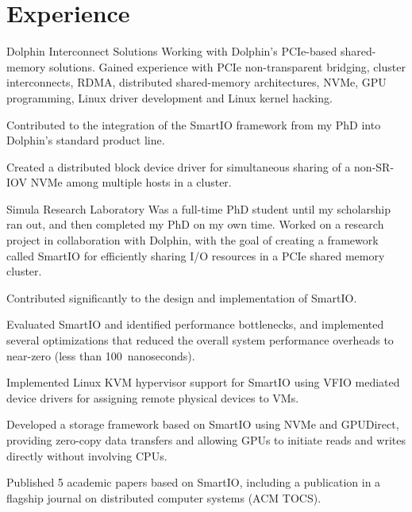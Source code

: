 \section{Experience}
\begin{experience}{Dolphin Interconnect Solutions}{
}
Working with Dolphin's PCIe-based shared-memory solutions. 
Gained experience with PCIe non-transparent bridging, cluster interconnects, RDMA, distributed shared-memory
architectures, NVMe, GPU programming, Linux driver development and Linux kernel hacking.
\begin{contribs}
    \item{Contributed to the integration of the SmartIO framework from my PhD into Dolphin's standard product line.}
	\item{Created a distributed block device driver for simultaneous sharing of a non-SR-IOV NVMe among multiple hosts in a cluster.}
\end{contribs}
\end{experience}


\begin{experience}{Simula Research Laboratory}{
}
Was a full-time PhD student until my scholarship ran out, and then completed my PhD on my own time.
Worked on a research project in collaboration with Dolphin, with the goal of creating a framework called SmartIO for efficiently sharing I/O resources in a PCIe shared memory cluster.%
\begin{contribs}
    \item{Contributed significantly to the design and implementation of SmartIO.}
    \item{Evaluated SmartIO and identified performance bottlenecks, and implemented several optimizations that reduced the overall system performance overheads to near-zero (less than 100~nanoseconds).}
	\item{Implemented Linux KVM hypervisor support for SmartIO using VFIO mediated device drivers
		for assigning remote physical devices to VMs.}
	\item{Developed a storage framework based on SmartIO using NVMe and GPUDirect, providing
		zero-copy data transfers and allowing GPUs to initiate reads and writes directly without involving CPUs.}
    \item{Published 5 academic papers based on SmartIO, including a publication in a flagship journal on distributed computer systems (ACM TOCS).}
\end{contribs}
\end{experience}

